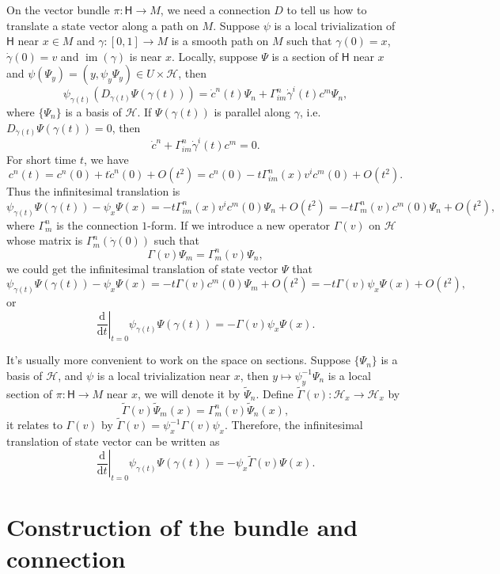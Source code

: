 \documentclass[14pt]{extarticle}
\begin{document}
On the vector bundle $\pi:\mathsf H\to M$, we need a connection $D$ to tell us how to translate a state vector along a path on $M$. Suppose $\psi$ is a local trivialization of $\mathsf H$ near $x\in M$ and $\gamma:[0,1]\to M$ is a smooth path on $M$ such that $\gamma(0)=x$, $\dot\gamma(0)=v$ and $\operatorname{im}(\gamma)$ is near $x$. Locally, suppose $\Psi$ is a section of $\mathsf H$ near $x$ and $\psi(\Psi_y)=(y,\psi_y\Psi_y)\in U\times \mathcal H$, then
\[
	\psi_{\gamma(t)}\left(D_{\dot\gamma(t)}\Psi(\gamma(t))\right)=\dot c^n(t)\Psi_n+\Gamma_{im}^n\dot\gamma^i(t)c^m\Psi_n,
\]
where $\{\Psi_n\}$ is a basis of $\mathcal H$. If $\Psi(\gamma(t))$ is parallel along $\gamma$, i.e. $D_{\dot\gamma(t)}\Psi(\gamma(t))=0$, then
\[
	\dot c^n+\Gamma_{im}^n\dot\gamma^i(t)c^m=0.
\]
For short time $t$, we have
\[
	c^n(t)=c^n(0)+t\dot c^n(0)+O(t^2)=c^n(0)-t\Gamma_{im}^n(x)v^i c^m(0)+O(t^2).
\]
Thus the infinitesimal translation is
\[
	\psi_{\gamma(t)}\Psi(\gamma(t))-\psi_{x}\Psi(x)=-t\Gamma_{im}^n(x)v^i c^m(0)\Psi_n+O(t^2)=-t\Gamma_{m}^n(v)c^m(0)\Psi_n+O(t^2),
\]
where $\Gamma^n_m$ is the connection $1$-form. If we introduce a new operator $\Gamma(v)$ on $\mathcal H$ whose matrix is $\Gamma_{m}^n(\dot\gamma(0))$ such that
\[
	\Gamma(v)\Psi_m=\Gamma_{m}^n(v)\Psi_n,
\]
we could get the infinitesimal translation of state vector $\Psi$ that
\[
	\psi_{\gamma(t)}\Psi(\gamma(t))-\psi_{x}\Psi(x)=-t\Gamma(v)c^m(0)\Psi_m+O(t^2)=-t\Gamma(v) \psi_{x}\Psi(x)+O(t^2),
\]
or
\[
	\left. \frac{\mathrm d}{\mathrm dt}\right|_{t=0}\psi_{\gamma(t)}\Psi(\gamma(t))=-\Gamma(v) \psi_{x}\Psi(x).
\]

It's usually more convenient to work on the space on sections. Suppose $\{\Psi_n\}$ is a basis of $\mathcal H$, and $\psi$ is a local trivialization near $x$, then $y\mapsto \psi_y^{-1}\Psi_n$ is a local section of $\pi:\mathsf H\to M$ near $x$, we will denote it by $\widetilde \Psi_n$. Define $\widetilde\Gamma(v):\mathcal H_x\to \mathcal H_x$ by
\[
	\widetilde\Gamma(v)\widetilde \Psi_m(x)=\Gamma^n_m(v)\widetilde \Psi_n(x),
\]
it relates to $\Gamma(v)$ by $\widetilde\Gamma(v)=\psi_x^{-1}\Gamma(v)\psi_x$. Therefore, the infinitesimal translation of state vector can be written as
\[
	\left. \frac{\mathrm d}{\mathrm dt}\right|_{t=0}\psi_{\gamma(t)}\Psi(\gamma(t))=- \psi_{x}\widetilde\Gamma(v)\Psi(x).
\]

\section{Construction of the bundle and connection}
\end{document}
